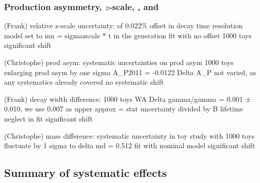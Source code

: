 \subsubsection[Production asymmetry, $z$-scale, DMd, and DGd]{Production asymmetry, $z$-scale, \DMd, and \DGd}
\label{sec:measurement_of_sin2beta:systematics:systematics:further_studies}

(Frank)
relative z-scale uncertainty:
of 0.022\%
offset in decay time resolution model set to mu = sigmazscale * t in the generation
fit with no offset
1000 toys
significant shift

(Christophe)
prod asym:
systematic uncertainties on prod asym
1000 toys
enlarging prod asym by one sigma A\_P2011 = -0.0122
Delta A\_P not varied, as any systematics already covered
no systematic shift

(Frank)
decay width difference:
1000 toys
WA Delta gamma/gamma = 0.001 ± 0.010, we use 0.007 as upper approx = stat uncertainty divided by B lifetime
neglect in fit
significant shift

(Christophe)
mass difference:
systematic uncertainty in toy study with 1000 toys
fluctuate by 1 sigma to delta md = 0.512
fit with nominal model
significant shift

\subsection{Summary of systematic effects}
\label{sec:measurement_of_sin2beta:systematics:summary}
